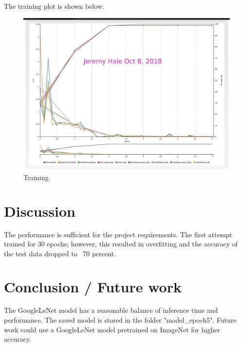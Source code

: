 \documentclass[10pt,journal,compsoc]{IEEEtran}
\begin{document}
The training plot is shown below.

\begin{figure}[thpb]
      \centering
      \includegraphics[width=\linewidth]{training_water}
      \caption{Training.}
      \label{fig:training}
\end{figure}

\section{Discussion}

The performance is sufficient for the project requirements. The first attempt trained for 30 epochs; however, this resulted in overfitting and the accuracy of the test data dropped to ~70 percent.

\section{Conclusion / Future work}
The GoogleLeNet model has a reasonable balance of inference time and performance. The saved model is stored in the folder "model\_epoch5". Future work could use a GoogleLeNet model pretrained on ImageNet for higher accuracy.


\end{document}

